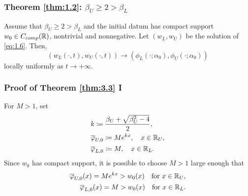 
\begin{frame}
    \frametitle{Theorem \ref{thm:1.2}: \texorpdfstring{\(\beta_U \geq 2 > \beta_L\)}{betaU >= 2 > betaL}}
    \begin{theorem}
        Assume that \(\beta_U \geq 2 > \beta_L\) and the initial datum has compact support \(w_{0} \in C_{comp}(\mathbb{R})\), nontrivial and nonnegative. Let \((w_L, w_{U})\) be the solution of \eqref{eq:1.6}. Then,
        \begin{equation}
            (w_L(\cdot, t), w_{U}(\cdot, t)) \to (\phi_L(\cdot; \alpha_0), \phi_U(\cdot; \alpha_0))
            \label{eq:3.6}
        \end{equation}
        locally uniformly as \(t \to +\infty\).
        \label{thm:3.3}
    \end{theorem}
\end{frame}


\begin{frame}
    \frametitle{Proof of Theorem \ref{thm:3.3} I}
    \begin{proofs}
        For \(M > 1\), set 
        \begin{align*}
            &k \coloneqq \frac{\beta_U + \sqrt{\beta_U^2 - 4}}{2}, \\
            &\overline{\varphi}_{U,0} \coloneqq M e^{kx}, \quad x \in \mathbb{R}_U, \\
            &\overline{\varphi}_{L,0} \coloneqq M, \quad x \in \mathbb{R}_L.
        \end{align*}
        Since \(w_0\) has compact support, it is possible to choose \(M > 1\) large enough that
        \begin{align*}
            \overline{\varphi}_{U,0}(x) = M e^{kx} > w_0(x) \quad \text{for } x \in \mathbb{R}_U, \\
            \overline{\varphi}_{L,0}(x) = M > w_0(x) \quad \text{for } x \in \mathbb{R}_L. 
        \end{align*}
    \end{proofs}
\end{frame}


